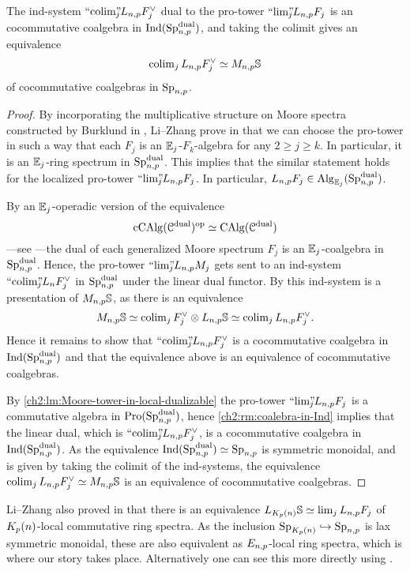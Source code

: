 \begin{lemma}
    \label{ch2:lm:coalgebra-ind-presentation-of-monochromatic-sphere}
    The ind-system $``\!\operatorname{colim}\!"_{\hspace{-5pt} j} L_{n,p} F_j^\vee$ dual to the pro-tower $``\!\lim\!"_{\hspace{-5pt} j} L_{n,p} F_j$ is an cocommutative coalgebra in $\operatorname{Ind}(\mathrm{Sp}_{n,p}^{\mathrm{dual}})$, and taking the colimit gives an equivalence 
    \[\operatorname{colim}_j L_{n,p} F_j^\vee \simeq M_{n,p}\mathbb{S}\] 
    of cocommutative coalgebras in $\mathrm{Sp}_{n,p}$. 
\end{lemma}
\begin{proof}
    By incorporating the multiplicative structure on Moore spectra constructed by Burklund in \cite{burklund_2022}, Li--Zhang prove in \cite[2.1.4]{li-zhang_2023} that we can choose the pro-tower in such a way that each $F_j$ is an $\mathbb{E}_j$-$F_k$-algebra for any $2\geq j \geq k$. In particular, it is an $\mathbb{E}_j$-ring spectrum in $\mathrm{Sp}_{n,p}^{\mathrm{dual}}$. This implies that the similar statement holds for the localized pro-tower $``\!\lim\!"_{\hspace{-5pt} j} L_{n,p} F_j$. In particular, $L_{n,p} F_j \in \operatorname{Alg}_{\mathbb{E}_j}(\mathrm{Sp}_{n,p}^{\mathrm{dual}})$. 
    
    By an $\mathbb{E}_j$-operadic version of the equivalence 
    \[\operatorname{cCAlg}(\EuScript{C}^{\mathrm{dual}})^{\mathrm{op}}\simeq \operatorname{CAlg}(\EuScript{C}^{\mathrm{dual}})\]
    ---see \cite[3.5]{peroux_2022}---the dual of each generalized Moore spectrum $F_j$ is an $\mathbb{E}_j$-coalgebra in $\mathrm{Sp}_{n,p}^{\mathrm{dual}}$. Hence, the pro-tower $``\!\lim\!"_{\hspace{-5pt} j} L_{n,p} M_j$ gets sent to an ind-system $``\!\operatorname{colim}\!"_{\hspace{-5pt} j} L_n F_j^\vee$ in $\mathrm{Sp}_{n,p}^{\mathrm{dual}}$ under the linear dual functor. By \cite[7.10(c)]{hovey-strickland_99} this ind-system is a presentation of $M_{n,p}\mathbb{S}$, as there is an equivalence 
    \[M_{n,p} \mathbb{S} \simeq \operatorname{colim}_j F_j^\vee \otimes L_{n,p}\mathbb{S} \simeq \operatorname{colim}_j L_{n,p} F_j^\vee.\]
    Hence it remains to show that $``\!\operatorname{colim}\!"_{\hspace{-5pt} j} L_{n,p} F_j^\vee$ is a cocommutative coalgebra in $\operatorname{Ind}(\mathrm{Sp}_{n,p}^{\mathrm{dual}})$ and that the equivalence above is an equivalence of cocommutative coalgebras. 

    By \cref{ch2:lm:Moore-tower-in-local-dualizable} the pro-tower $``\!\lim\!"_{\hspace{-5pt} j} L_{n,p} F_j$ is a commutative algebra in $\operatorname{Pro}(\mathrm{Sp}_{n,p}^{\mathrm{dual}})$, hence \cref{ch2:rm:coalebra-in-Ind} implies that the linear dual, which is $``\!\operatorname{colim}\!"_{\hspace{-5pt} j} L_{n,p} F_j^\vee$, is a cocommutative coalgebra in $\operatorname{Ind}(\mathrm{Sp}_{n,p}^{\mathrm{dual}})$. As the equivalence $\operatorname{Ind}(\mathrm{Sp}_{n,p}^{\mathrm{dual}})\simeq \mathrm{Sp}_{n,p}$ is symmetric monoidal, and is given by taking the colimit of the ind-systems, the equivalence $\operatorname{colim}_j L_{n,p} F_j^\vee \simeq M_{n,p} \mathbb{S}$ is an equivalence of cocommutative coalgebras.  
\end{proof}

\begin{remark}
    Li--Zhang also proved in \cite[2.1.5]{li-zhang_2023} that there is an equivalence $L_{K_p(n)}\mathbb{S} \simeq \lim_j L_{n,p} F_j$ of ${K_p(n)}$-local commutative ring spectra. As the inclusion $\mathrm{Sp}_{{K_p(n)}}\hookrightarrow \mathrm{Sp}_{n,p}$ is lax symmetric monoidal, these are also equivalent as $E_{n,p}$-local ring spectra, which is where our story takes place. Alternatively one can see this more directly using \cite[2.1.6]{li-zhang_2023}. 
\end{remark}


